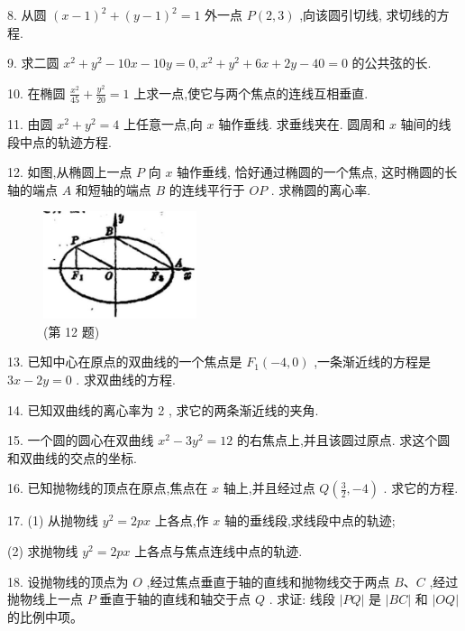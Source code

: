\documentclass[lang=cn,newtx,10pt,scheme=chinese]{elegantbook}
\begin{document}
8. 从圆 \({\left( x - 1\right) }^{2} + {\left( y - 1\right) }^{2} = 1\) 外一点 \(P\left( {2,3}\right)\) ,向该圆引切线, 求切线的方程.

9. 求二圆 \({x}^{2} + {y}^{2} - {10x} - {10y} = 0,{x}^{2} + {y}^{2} + {6x} + {2y} - {40} = 0\) 的公共弦的长.

10. 在椭圆 \(\frac{{x}^{2}}{45} + \frac{{y}^{2}}{20} = 1\) 上求一点,使它与两个焦点的连线互相垂直.

11. 由圆 \({x}^{2} + {y}^{2} = 4\) 上任意一点,向 \(x\) 轴作垂线. 求垂线夹在. 圆周和 \(x\) 轴间的线段中点的轨迹方程.

12. 如图,从椭圆上一点 \(P\) 向 \(x\) 轴作垂线, 恰好通过椭圆的一个焦点, 这时椭圆的长轴的端点 \(A\) 和短轴的端点 \(B\) 的连线平行于 \({OP}\) . 求椭圆的离心率.

\begin{figure}[h]
  \centering
  \includegraphics[max width=0.4\textwidth]{images/01912cc2-ffb6-728e-9ae7-b113ff05c64b_130_291818.jpg}
  \caption{(第 12 题)}
\end{figure}



13. 已知中心在原点的双曲线的一个焦点是 \({F}_{1}\left( {-4,0}\right)\) ,一条渐近线的方程是 \({3x} - {2y} = 0\) . 求双曲线的方程.

14. 已知双曲线的离心率为 2 , 求它的两条渐近线的夹角.

15. 一个圆的圆心在双曲线 \({x}^{2} - 3{y}^{2} = {12}\) 的右焦点上,并且该圆过原点. 求这个圆和双曲线的交点的坐标.

16. 已知抛物线的顶点在原点,焦点在 \(x\) 轴上,并且经过点 \(Q\left( {\frac{3}{2}, - 4}\right)\) . 求它的方程.

17. (1) 从抛物线 \({y}^{2} = {2px}\) 上各点,作 \(x\) 轴的垂线段,求线段中点的轨迹;

(2) 求抛物线 \({y}^{2} = {2px}\) 上各点与焦点连线中点的轨迹.

18. 设抛物线的顶点为 \(O\) ,经过焦点垂直于轴的直线和抛物线交于两点 \(B\text{、}C\) ,经过抛物线上一点 \(P\) 垂直于轴的直线和轴交于点 \(Q\) . 求证: 线段 \(\left| {PQ}\right|\) 是 \(\left| {BC}\right|\) 和 \(\left| {OQ}\right|\) 的比例中项。
\end{document}
